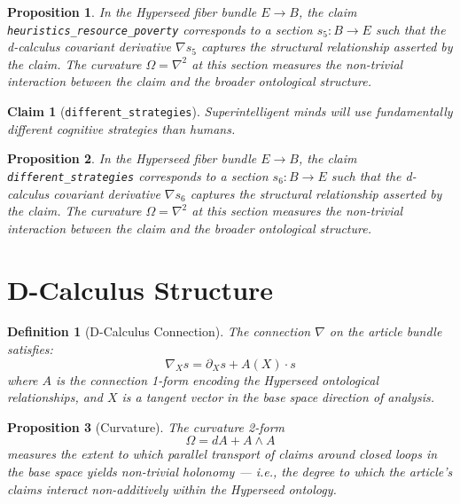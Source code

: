 \documentclass{article}
\newtheorem{claim}{Claim}
\newtheorem{definition}{Definition}
\newtheorem{proposition}{Proposition}
\begin{document}
\begin{proposition}
In the Hyperseed fiber bundle $E \to B$, the claim \texttt{heuristics_resource_poverty} corresponds to a section $s_5: B \to E$ such that the d-calculus covariant derivative $\nabla s_5$ captures the structural relationship asserted by the claim. The curvature $\Omega = \nabla^2$ at this section measures the non-trivial interaction between the claim and the broader ontological structure.
\end{proposition}

\begin{claim}[\texttt{different_strategies}]
Superintelligent minds will use fundamentally different cognitive strategies than humans.
\end{claim}

\begin{proposition}
In the Hyperseed fiber bundle $E \to B$, the claim \texttt{different_strategies} corresponds to a section $s_6: B \to E$ such that the d-calculus covariant derivative $\nabla s_6$ captures the structural relationship asserted by the claim. The curvature $\Omega = \nabla^2$ at this section measures the non-trivial interaction between the claim and the broader ontological structure.
\end{proposition}

\section{D-Calculus Structure}

\begin{definition}[D-Calculus Connection]
The connection $\nabla$ on the article bundle satisfies:
\begin{equation}
  \nabla_X s = \partial_X s + A(X) \cdot s
\end{equation}
where $A$ is the connection 1-form encoding the Hyperseed ontological relationships, and $X$ is a tangent vector in the base space direction of analysis.
\end{definition}

\begin{proposition}[Curvature]
The curvature 2-form
\begin{equation}
  \Omega = dA + A \wedge A
\end{equation}
measures the extent to which parallel transport of claims around closed loops in the base space yields non-trivial holonomy --- i.e., the degree to which the article's claims interact non-additively within the Hyperseed ontology.
\end{proposition}
\end{document}
